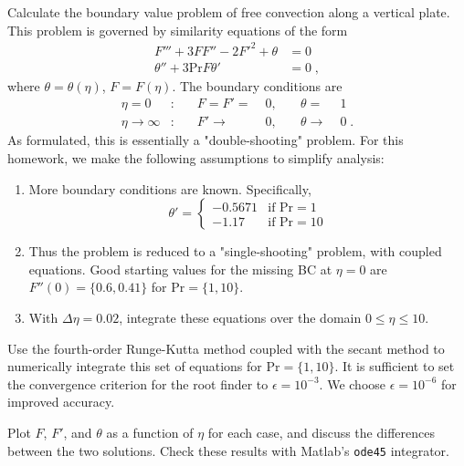\documentclass[12pt]{article}
\begin{document}
Calculate the boundary value problem of free convection along a vertical plate. This problem is governed by similarity equations of the form
\begin{equation}
\begin{aligned}
F''' + 3 F F'' - 2F'^2 + \theta &= 0 \\
\theta'' + 3 \text{Pr} F \theta' &= 0
\;,
\end{aligned}
\end{equation}
where $\theta = \theta(\eta)$, $F = F(\eta)$. The boundary conditions are
\begin{equation}
\begin{aligned}
\eta = 0 &: &\quad F = F' =\; &0, &\quad \theta =\; &1 \\
\eta \rightarrow \infty &: &\quad F' \rightarrow\; &0, &\quad \theta \rightarrow\; &0
\;.
\end{aligned}
\end{equation}
As formulated, this is essentially a "double-shooting" problem. For this homework, we make the following assumptions to simplify analysis:
\begin{enumerate}
\item More boundary conditions are known. Specifically,
\begin{equation}
\theta' =
\begin{cases}
-0.5671 &\text{if Pr} = 1 \\
-1.17 &\text{if Pr} = 10
\end{cases}
\end{equation}
\item Thus the problem is reduced to a "single-shooting" problem, with coupled equations. Good starting values for the missing BC at $\eta = 0$ are $F''(0) = \{0.6, 0.41\}$ for $\text{Pr} = \{1, 10\}$.
\item With $\Delta\eta = 0.02$, integrate these equations over the domain $0 \le \eta \le 10$.
\end{enumerate}

Use the fourth-order Runge-Kutta method coupled with the secant method to numerically integrate this set of equations for $\text{Pr} = \{1,10\}$. It is sufficient to set the convergence criterion for the root finder to $\epsilon = 10^{-3}$. We choose $\epsilon = 10^{-6}$ for improved accuracy.

Plot $F$, $F'$, and $\theta$ as a function of $\eta$ for each case, and discuss the differences between the two solutions. Check these results with Matlab's \lstinline|ode45| integrator.
\end{document}
